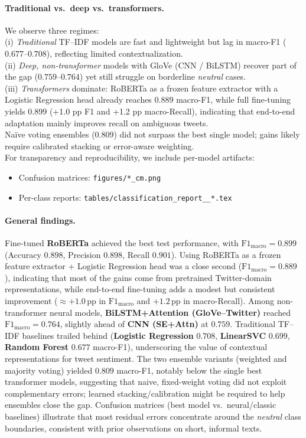 \documentclass[10pt]{article}
\begin{document}
\paragraph{Traditional vs.\ deep vs.\ transformers.}
We observe three regimes:\\
(i) \emph{Traditional} TF--IDF models are fast and lightweight but lag in macro-F1 ($0.677$--$0.708$), reflecting limited contextualization.\\
(ii) \emph{Deep, non-transformer} models with GloVe (CNN / BiLSTM) recover part of the gap ($0.759$--$0.764$) yet still struggle on borderline \textit{neutral} cases.\\
(iii) \emph{Transformers} dominate: RoBERTa as a frozen feature extractor with a Logistic Regression head already reaches $0.889$ macro-F1, while full fine-tuning yields $0.899$ (+1.0 pp F1 and +1.2 pp macro-Recall), indicating that end-to-end adaptation mainly improves recall on ambiguous tweets.\\
Naïve voting ensembles (0.809) did not surpass the best single model; gains likely require calibrated stacking or error-aware weighting.\\
For transparency and reproducibility, we include per-model artifacts:
\begin{itemize}
  \item Confusion matrices: \texttt{figures/*\_cm.png}
  \item Per-class reports: \texttt{tables/classification\_report\_\_*.tex}
\end{itemize}

\paragraph{General findings.}
Fine-tuned \textbf{RoBERTa} achieved the best test performance, with $\mathrm{F1}_{\mathrm{macro}}=0.899$ (Accuracy $0.898$, Precision $0.898$, Recall $0.901$). Using RoBERTa as a frozen feature extractor + Logistic Regression head was a close second ($\mathrm{F1}_{\mathrm{macro}}=0.889$), indicating that most of the gains come from pretrained Twitter-domain representations, while end-to-end fine-tuning adds a modest but consistent improvement ($\approx +1.0\,\mathrm{pp}$ in $\mathrm{F1}_{\mathrm{macro}}$ and $+1.2\,\mathrm{pp}$ in macro-Recall). Among non-transformer neural models, \textbf{BiLSTM+Attention (GloVe--Twitter)} reached $\mathrm{F1}_{\mathrm{macro}}=0.764$, slightly ahead of \textbf{CNN (SE+Attn)} at $0.759$. Traditional TF--IDF baselines trailed behind (\textbf{Logistic Regression} $0.708$, \textbf{LinearSVC} $0.699$, \textbf{Random Forest} $0.677$ macro-F1), underscoring the value of contextual representations for tweet sentiment. The two ensemble variants (weighted and majority voting) yielded $0.809$ macro-F1, notably below the single best transformer models, suggesting that naive, fixed-weight voting did not exploit complementary errors; learned stacking/calibration might be required to help ensembles close the gap. Confusion matrices (best model vs.\ neural/classic baselines) illustrate that most residual errors concentrate around the \emph{neutral} class boundaries, consistent with prior observations on short, informal texts.
\end{document}
